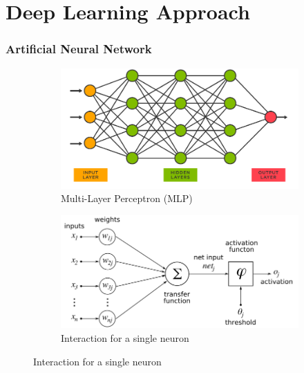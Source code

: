 \documentclass{beamer}
\begin{document}
\section{Deep Learning Approach}
\begin{frame}[b]
    \frametitle{Artificial Neural Network}
    \begin{figure}
    \begin{subfigure}{.48\linewidth}
    \includegraphics[width = \linewidth]{img/05_ANN.png}
    \caption{Multi-Layer Perceptron (MLP)}
    \end{subfigure}
    \hfill
    \begin{subfigure}{0.48\linewidth}
    \includegraphics[width = \linewidth]{img/05_Neuron.png}
    \caption{Interaction for a single neuron}
    \end{subfigure}
    \end{figure}

\end{frame} 
\end{document}
